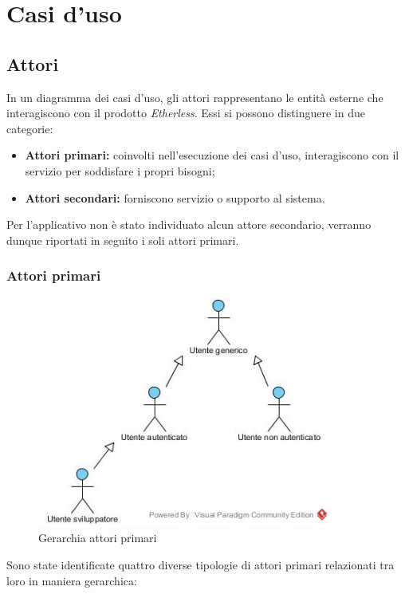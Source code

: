 \section{Casi d'uso}

\subsection{Attori}
In un diagramma dei casi d'uso, gli attori rappresentano le entità esterne che interagiscono con il prodotto \textit{Etherless}. Essi si possono distinguere in due categorie:
\begin{itemize}
	\item \textbf{Attori primari:} coinvolti nell'esecuzione dei casi d'uso, interagiscono con il servizio per soddisfare i propri bisogni;
	\item \textbf{Attori secondari:} forniscono servizio o supporto al sistema. 
\end{itemize}
Per l'applicativo non è stato individuato alcun attore secondario, verranno dunque riportati in seguito i soli attori primari.

\subsubsection{Attori primari}
\begin{figure}[h]
	\centering
	\includegraphics[width=9.7cm]{res/img/gerarchiaAttoriPrimari.jpg}
	\caption{Gerarchia attori primari}
\end{figure}

Sono state identificate quattro diverse tipologie di attori primari relazionati tra loro in maniera gerarchica:

